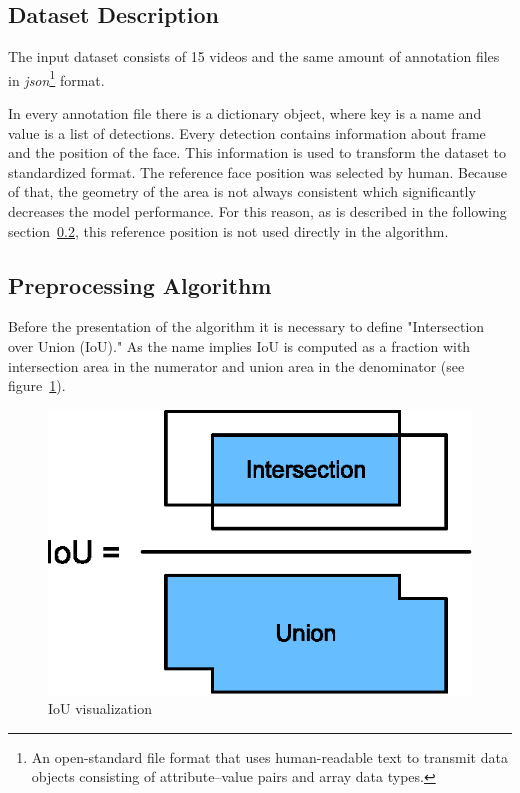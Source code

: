 \subsection{Dataset Description}\label{subsec:dataset-description}
The input dataset consists of 15 videos and the same amount of annotation files in \textit{json}\footnote{An
open-standard file format that uses human-readable text to transmit data objects consisting of attribute–value pairs
and array data types.} format.

In every annotation file there is a dictionary object, where key is a name and value is a list of detections.
Every detection contains information about frame and the position of the face.
This information is used to transform the dataset to standardized format.
The reference face position was selected by human.
Because of that, the geometry of the area is not always consistent which significantly decreases the model performance.
For this reason, as is described in the following section~\ref{subsec:preproalgo}, this reference position is not
used directly in the algorithm.

\subsection{Preprocessing Algorithm}\label{subsec:preproalgo}
Before the presentation of the algorithm it is necessary to define "Intersection over Union (IoU)."
As the name implies IoU is computed as a fraction with intersection area in the numerator and union area in the
denominator (see figure~\ref{fig:iou}).

\begin{figure}[H]
    \centering
    \includegraphics{images/implementation/iou.eps}
    \caption{IoU visualization\cite{IoU}}
    \label{fig:iou}
\end{figure}

